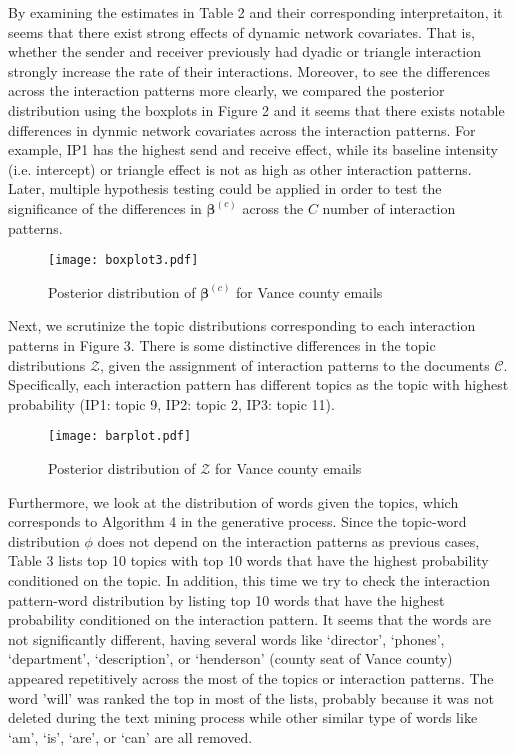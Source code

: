 \documentclass[a4paper]{article}
\begin{document}
By examining the estimates in Table 2 and their corresponding interpretaiton, it seems that there exist strong effects of dynamic network covariates. That is, whether the sender and receiver previously had dyadic or triangle interaction strongly increase the rate of their interactions. Moreover, to see the differences across the interaction patterns more clearly, we compared the posterior distribution using the boxplots in Figure 2 and it seems that there exists notable differences in dynmic network covariates across the interaction patterns. For example, IP1 has the highest send and receive effect, while its baseline intensity (i.e. intercept) or triangle effect is not as high as other interaction patterns. Later, multiple hypothesis testing could be applied in order to test the significance of the differences in  $\boldsymbol{\beta}^{(c)}$ across the $C$ number of interaction patterns.\\
\begin{figure}[ht]
	\centering
	\texttt{[image: boxplot3.pdf]} 
	\caption{Posterior distribution of  $\boldsymbol{\beta}^{(c)}$ for Vance county emails}
	\label{fig:Vanceboxplot}
\end{figure}
\newline Next, we scrutinize the topic distributions corresponding to each interaction patterns in Figure 3. There is some distinctive differences in the topic distributions $\mathcal{Z}$, given the assignment of interaction patterns to the documents $\mathcal{C}$. Specifically, each interaction pattern has different topics as the topic with highest probability (IP1: topic 9, IP2: topic 2, IP3: topic 11).
\footnotesize
\begin{figure}[ht]
	\centering
	\texttt{[image: barplot.pdf]} 
\caption{Posterior distribution of  $\mathcal{Z}$ for Vance county emails}
\label{fig:Vancebarplot}
\end{figure}
\normalsize
\newline
Furthermore, we look at the distribution of words given the topics, which corresponds to Algorithm 4 in the generative process. Since the topic-word distribution $\phi$ does not depend on the interaction patterns as previous cases, Table 3 lists top 10 topics with top 10 words that have the highest probability conditioned on the topic. In addition, this time we try to check the interaction pattern-word distribution by listing top 10 words that have the highest probability conditioned on the interaction pattern. It seems that the words are not significantly different, having several words like `director', `phones', `department', `description', or `henderson' (county seat of Vance county) appeared repetitively across the most of the topics or interaction patterns. The word 'will' was ranked the top in most of the lists, probably because it was not deleted during the text mining process while other similar type of words like `am', `is', `are', or `can' are all removed. \\
\end{document}
